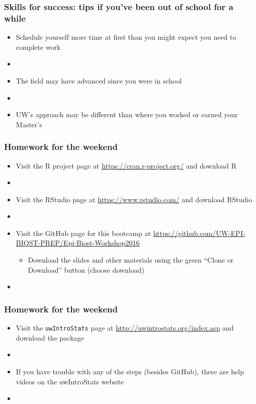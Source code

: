 \documentclass[12pt]{beamer}
\newcommand{\myframe}[1]{\begin{frame} \frametitle{#1}}
\begin{document}
\myframe{Skills for success: tips if you've been out of school for a while}
\begin{itemize}
\item Schedule yourself more time at first than you might expect you need to complete work
\item[]
\item The field may have advanced since you were in school
\item[]
\item UW's approach may be different than where you worked or earned your Master's
\end{itemize}
\end{frame}

\myframe{Homework for the weekend}
\begin{itemize}
\item Visit the R project page at \url{https://cran.r-project.org/} and download R
\item[]
\item Visit the RStudio page at \url{https://www.rstudio.com/} and download RStudio
\item[]
\item Visit the GitHub page for this bootcamp at \url{https://github.com/UW-EPI-BIOST-PREP/Epi-Biost-Workshop2016}
\begin{itemize}
\item Download the slides and other materials using the green ``Clone or Download'' button (choose download)
\end{itemize}
\item[]
\end{itemize}
\end{frame}

\myframe{Homework for the weekend}
\begin{itemize}
\item Visit the \texttt{uwIntroStats} page at \url{http://uwintrostats.org/index.asp} and download the package
\item[]
\item If you have trouble with any of the steps (besides GitHub), there are help videos on the uwIntroStats website
\item[]
\end{itemize}
\end{frame}
\end{document}
